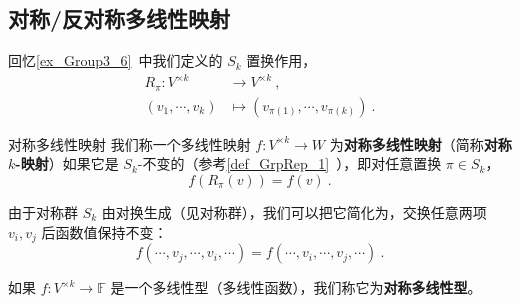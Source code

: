 
\begin{issues}
\issueTODO
\end{issues}


\subsection{对称/反对称多线性映射}

回忆\autoref{ex_Group3_6}~中我们定义的 $S_k$ 置换作用，
\begin{equation}
\begin{aligned}
R_\pi: V^{\times k} &\to V^{\times k}~, \\
(v_1, \cdots, v_k) &\mapsto (v_{\pi(1)}, \cdots, v_{\pi(k)})~.
\end{aligned}
\end{equation}

\begin{definition}{对称多线性映射}
我们称一个多线性映射 $f: V^{\times k} \to W$ 为\textbf{对称多线性映射}（简称\textbf{对称 $k$-映射}）如果它是 $S_k$-不变的（参考\autoref{def_GrpRep_1}~），即对任意置换 $\pi \in S_k$，
\begin{equation}
f(R_\pi(v)) = f(v)~.
\end{equation}

由于对称群 $S_k$ 由对换生成（见对称群），我们可以把它简化为，交换任意两项 $v_i, v_j$ 后函数值保持不变：
\begin{equation}
f(\cdots, v_j, \cdots, v_i, \cdots) = f(\cdots, v_i, \cdots, v_j, \cdots)~.
\end{equation}

如果 $f: V^{\times k} \to \mathbb{F}$ 是一个多线性型（多线性函数），我们称它为\textbf{对称多线性型}。
\end{definition}


%

